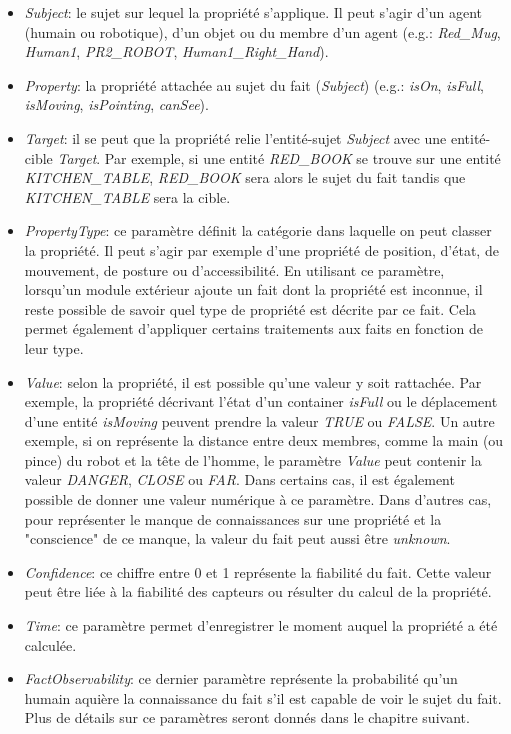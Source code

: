\documentclass[a4paper,11pt,twoside]{StyleThese}
\begin{document}
\begin{itemize}
\item \textit{Subject}: le sujet sur lequel la propriété s'applique. Il peut s'agir d'un agent (humain ou robotique), d'un objet ou du membre d'un agent (e.g.: \textit{Red\_Mug}, \textit{Human1}, \textit{PR2\_ROBOT}, \textit{Human1\_Right\_Hand}).
\item \textit{Property}: la propriété attachée au sujet du fait (\textit{Subject}) (e.g.: \textit{isOn}, \textit{isFull}, \textit{isMoving}, \textit{isPointing}, \textit{canSee}).
\item \textit{Target}: il se peut que la propriété relie l'entité-sujet \textit{Subject} avec une entité-cible \textit{Target}. Par exemple, si une entité \textit{RED\_BOOK} se trouve sur une entité \textit{KITCHEN\_TABLE}, \textit{RED\_BOOK} sera alors le sujet du fait tandis que \textit{KITCHEN\_TABLE} sera la cible.
\item \textit{PropertyType}: ce paramètre définit la catégorie dans laquelle on peut classer la propriété. Il peut s'agir par exemple d'une propriété de position, d'état, de mouvement, de posture ou d'accessibilité. En utilisant ce paramètre, lorsqu'un module extérieur ajoute un fait dont la propriété est inconnue, il reste possible de savoir quel type de propriété est décrite par ce fait. Cela permet également d'appliquer certains traitements aux faits en fonction de leur type.
\item \textit{Value}: selon la propriété, il est possible qu'une valeur y soit rattachée. Par exemple, la propriété décrivant l'état d'un container \textit{isFull} ou le déplacement d'une entité \textit{isMoving} peuvent prendre la valeur \textit{TRUE} ou \textit{FALSE}. Un autre exemple, si on représente la distance entre deux membres, comme la main (ou pince) du robot et la tête de l'homme, le paramètre \textit{Value} peut contenir la valeur \textit{DANGER}, \textit{CLOSE} ou \textit{FAR}. Dans certains cas, il est également possible de donner une valeur numérique à ce paramètre.
Dans d'autres cas, pour représenter le manque de connaissances sur une propriété et la "conscience" de ce manque, la valeur du fait peut aussi être \textit{unknown}.
\item \textit{Confidence}: ce chiffre entre 0 et 1 représente la fiabilité du fait. Cette valeur peut être liée à la fiabilité des capteurs ou résulter du calcul de la propriété.
\item \textit{Time}: ce paramètre permet d'enregistrer le moment auquel la propriété a été calculée.
\item \textit{FactObservability}: ce dernier paramètre représente la probabilité qu'un humain aquière la connaissance du fait s'il est capable de voir le sujet du fait. Plus de détails sur ce paramètres seront donnés dans le chapitre suivant.
\end{itemize}
\end{document}
